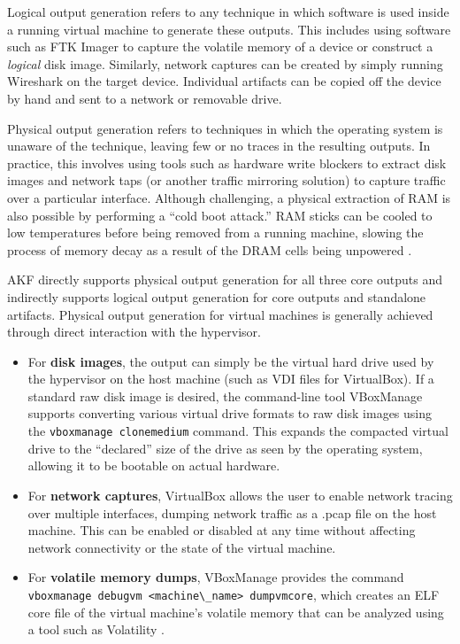 \documentclass[letterpaper,12pt]{report}
\def\tightlist{}
\newcommand{\passthrough}[1]{#1}
\begin{document}
Logical output generation refers to any technique in which software is
used inside a running virtual machine to generate these outputs. This
includes using software such as FTK Imager
\cite{exterroFTKImagerForensic} to capture the volatile memory of a
device or construct a \emph{logical} disk image. Similarly, network
captures can be created by simply running Wireshark on the target
device. Individual artifacts can be copied off the device by hand and
sent to a network or removable drive.

Physical output generation refers to techniques in which the operating
system is unaware of the technique, leaving few or no traces in the
resulting outputs. In practice, this involves using tools such as
hardware write blockers to extract disk images and network taps (or
another traffic mirroring solution) to capture traffic over a particular
interface. Although challenging, a physical extraction of RAM is also
possible by performing a ``cold boot attack.'' RAM sticks can be cooled
to low temperatures before being removed from a running machine, slowing
the process of memory decay as a result of the DRAM cells being
unpowered \cite{yitbarekColdBootAttacks2017}.

AKF directly supports physical output generation for all three core
outputs and indirectly supports logical output generation for core
outputs and standalone artifacts. Physical output generation for virtual
machines is generally achieved through direct interaction with the
hypervisor.

\begin{itemize}
\tightlist
\item
  For \textbf{disk images}, the output can simply be the virtual hard
  drive used by the hypervisor on the host machine (such as VDI files
  for VirtualBox). If a standard raw disk image is desired, the
  command-line tool VBoxManage supports converting various virtual drive
  formats to raw disk images using the
  \passthrough{\lstinline!vboxmanage clonemedium!} command. This expands
  the compacted virtual drive to the ``declared'' size of the drive as
  seen by the operating system, allowing it to be bootable on actual
  hardware.
\item
  For \textbf{network captures}, VirtualBox allows the user to enable
  network tracing over multiple interfaces, dumping network traffic as a
  .pcap file on the host machine. This can be enabled or disabled at any
  time without affecting network connectivity or the state of the
  virtual machine.
\item
  For \textbf{volatile memory dumps}, VBoxManage provides the command
  \passthrough{\lstinline!vboxmanage debugvm <machine\_name> dumpvmcore!},
  which creates an ELF core file of the virtual machine's volatile
  memory that can be analyzed using a tool such as Volatility
  \cite{volatilityfoundationVolatility32025}.
\end{itemize}
\end{document}

